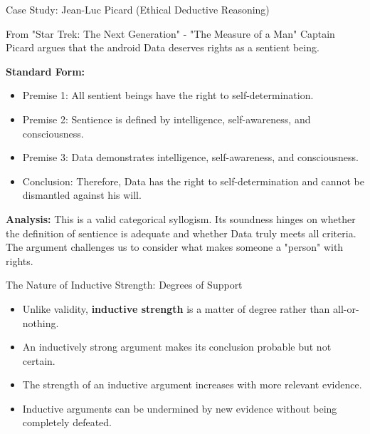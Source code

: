 \documentclass{beamer}
\begin{document}
\begin{frame}{Case Study: Jean-Luc Picard (Ethical Deductive Reasoning)}
    \begin{block}{From "Star Trek: The Next Generation" - "The Measure of a Man"}
        Captain Picard argues that the android Data deserves rights as a sentient being.
    \end{block}
    \small
    \textbf{Standard Form:}
    \begin{itemize}
        \item Premise 1: All sentient beings have the right to self-determination.
        \item Premise 2: Sentience is defined by intelligence, self-awareness, and consciousness.
        \item Premise 3: Data demonstrates intelligence, self-awareness, and consciousness.
        \item Conclusion: Therefore, Data has the right to self-determination and cannot be dismantled against his will.
    \end{itemize}
    
    \textbf{Analysis:} This is a valid categorical syllogism. Its soundness hinges on whether the definition of sentience is adequate and whether Data truly meets all criteria. The argument challenges us to consider what makes someone a "person" with rights.
\end{frame}

\begin{frame}{The Nature of Inductive Strength: Degrees of Support}
    \begin{itemize}
        \item Unlike validity, \textbf{inductive strength} is a matter of degree rather than all-or-nothing.
        \item An inductively strong argument makes its conclusion probable but not certain.
        \item The strength of an inductive argument increases with more relevant evidence.
        \item Inductive arguments can be undermined by new evidence without being completely defeated.
    \end{itemize}
    
\end{frame}
\end{document}
